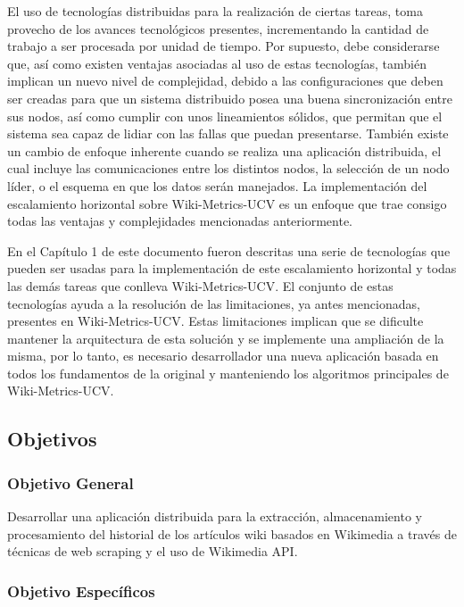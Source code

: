 El uso de tecnologías distribuidas para la realización de ciertas tareas, toma provecho
de los avances tecnológicos presentes, incrementando la cantidad de trabajo a ser
procesada por unidad de tiempo. Por supuesto, debe considerarse que, así como existen
ventajas asociadas al uso de estas tecnologías, también implican un nuevo nivel de
complejidad, debido a las configuraciones que deben ser creadas para que un sistema
distribuido posea una buena sincronización entre sus nodos, así como cumplir con unos
lineamientos sólidos, que permitan que el sistema sea capaz de lidiar con las fallas que
puedan presentarse. También existe un cambio de enfoque inherente cuando se realiza
una aplicación distribuida, el cual incluye las comunicaciones entre los distintos nodos,
la selección de un nodo líder, o el esquema en que los datos serán manejados. La
implementación del escalamiento horizontal sobre Wiki-Metrics-UCV es un enfoque que trae
consigo todas las ventajas y complejidades mencionadas anteriormente.

En el Capítulo 1 de este documento fueron descritas una serie de tecnologías que
pueden ser usadas para la implementación de este escalamiento horizontal y todas las
demás tareas que conlleva Wiki-Metrics-UCV. El conjunto de estas tecnologías ayuda a la
resolución de las limitaciones, ya antes mencionadas, presentes en Wiki-Metrics-UCV. Estas
limitaciones implican que se dificulte mantener la arquitectura de esta solución y se
implemente una ampliación de la misma, por lo tanto, es necesario desarrollador una
nueva aplicación basada en todos los fundamentos de la original y manteniendo los
algoritmos principales de Wiki-Metrics-UCV.

\subsection{Objetivos}

\subsubsection{Objetivo General}

Desarrollar una aplicación distribuida para la extracción, almacenamiento y
procesamiento del historial de los artículos wiki basados en Wikimedia a través de
técnicas de web scraping y el uso de Wikimedia API.

\subsubsection{Objetivo Específicos}

